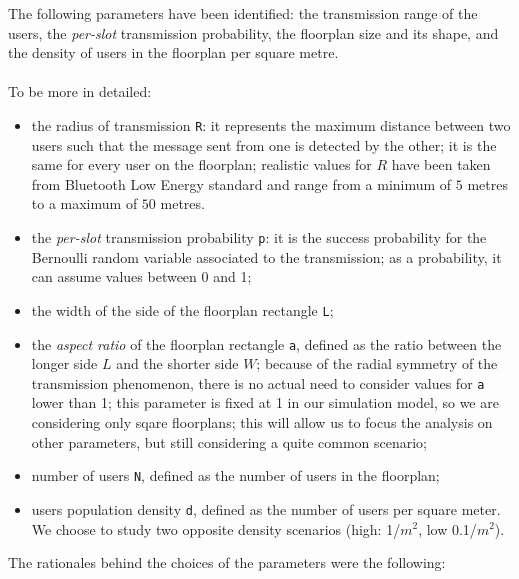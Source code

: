The following parameters have been identified: the transmission range of the
users, the \textit{per-slot} transmission probability, the floorplan size and
its shape, and the density of users in the floorplan per square metre.\\
\\
To be more in detailed:
\begin{itemize}
	\item the radius of transmission \colorbox{gray!30}{\large \texttt{R}}: it
	represents the maximum distance between two users such that the message
	sent from one is detected by the other; it is the same for every user on
	the floorplan; realistic values for $R$ have been taken from Bluetooth Low
	Energy standard and range from a minimum of $5$ metres to a maximum of $50$
	metres.
	\item the \textit{per-slot} transmission probability
	\colorbox{gray!30}{\large \texttt{p}}: it is the success probability for the
	Bernoulli random variable associated to the transmission; as a probability,
	it can assume values between 0 and 1;
    \item the width of the side of the floorplan rectangle
    \colorbox{gray!30}{\large \texttt{L}};
	\item the \textit{aspect ratio} of the floorplan rectangle
	\colorbox{gray!30}{\large \texttt{a}}, defined as the ratio between the
	longer side $L$ and the shorter side $W$; because of the radial symmetry of
	the transmission phenomenon, there is no actual need to consider values for
	\texttt{a} lower than 1; this parameter is fixed at 1 in our simulation model, 
	so we are considering only sqare floorplans; this will allow us to focus the
	analysis on other parameters, but still considering a quite common scenario;
	\item number of users \colorbox{gray!30}{\large \texttt{N}}, defined
	as the number of users in the floorplan;
	\item users population density \colorbox{gray!30}{\large \texttt{d}},
	defined as the number of users per square meter. We choose to study two
	opposite density scenarios (high: 1/$m^2$, low 0.1/$m^2$).
\end{itemize}
The rationales behind the choices of the parameters were the following:
